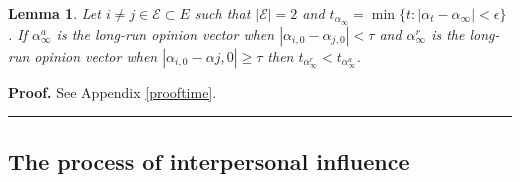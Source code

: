 \documentclass{article}
\newtheorem{lemma}{Lemma}
\newenvironment{proof}[1][Proof]{\textbf{#1.} }{\ \rule{0.5em}{0.5em}}
\begin{document}
\begin{lemma} Let $i \neq j \in \mathcal{E} \subset E$ such that $|\mathcal{E}|=2$ and $t_{\alpha_{\infty }} = \min \{ t : | \alpha_{t} - \alpha_{\infty } | < \epsilon  \} $ . If $\alpha_{\infty}^a$ is the long-run opinion vector when $|\alpha_{i,0} - \alpha_{j,0} | < \tau$ and $\alpha^r_{\infty}$ is the long-run opinion vector when $|\alpha_{i,0} - \alpha{j,0} | \geq \tau$ then $t_{\alpha^r_{\infty }} < t_{\alpha^a_{\infty }}$.  \label{time}
\end{lemma}
\noindent \begin{proof}  See Appendix \ref{prooftime}.
\end{proof}



\subsection{The process of interpersonal influence } \label{convergence}

\end{document}
